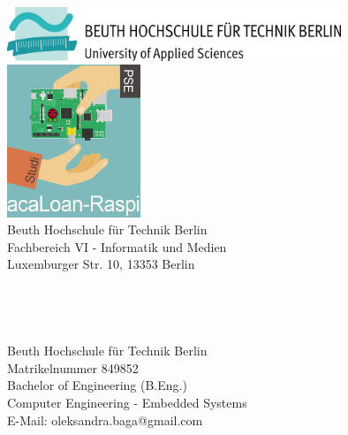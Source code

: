 \begin{titlepage}
	\tgherosfont
	\centering

	\includegraphics[width=10cm]{gfx/Beuth-Logo_horizontal} \\[8mm]
	\includegraphics[width=4cm]{gfx/csm_acaLoan-Raspi} \\[0mm]

    {\normalsize Beuth Hochschule für Technik Berlin}\\
    {\normalsize Fachbereich VI  - Informatik und Medien}\\
    {\normalsize Luxemburger Str. 10, 13353 Berlin}\\[10mm]

	{\LARGE \color{ctcolortitle}\textbf{\thesisTitle}}\\[5mm]
	{\color{ctcolortitle}\textbf{\thesisTitleEng}}\\[10mm]
	{\LARGE \color{ctcolortitle}\textbf{\thesisTitleDe}}\\[10mm]
	
	{\LARGE \thesisName} \\[5mm]
	    {\normalsize Beuth Hochschule für Technik Berlin} \\
    {\normalsize Matrikelnummer 849852} \\
	{\normalsize Bachelor of Engineering (B.Eng.)} \\
	{\normalsize Computer Engineering -  Embedded Systems} \\


	{\small E-Mail: oleksandra.baga@gmail.com} \\


\end{titlepage}
